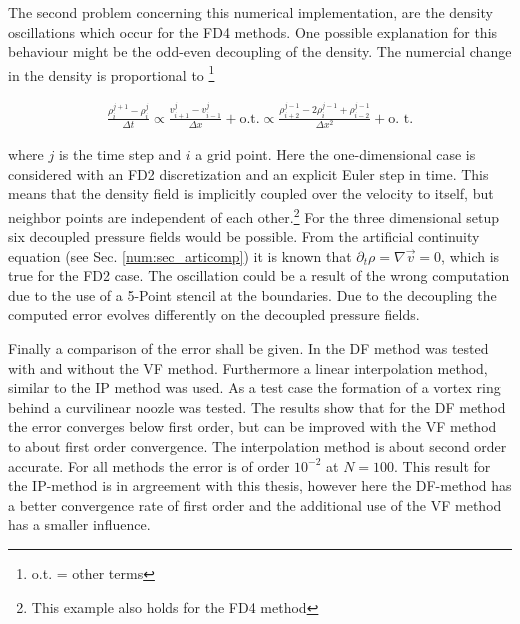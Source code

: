 The second problem concerning this numerical implementation, are the density oscillations
which occur for the FD4 methods.
One possible explanation for this behaviour might be the odd-even decoupling of the density.
The numercial change in the density is  proportional to \footnote{o.t. = other terms}


\begin{align}
    \frac{\rho^{j+1}_{i} -  \rho^{j}_i}{\Delta t}  \propto \frac{ v^j_{i+1} - v^j_{i-1}}{\Delta x} + \text{o.t.}
     \propto \frac{\rho^{j-1}_{i+2} - 2 \rho^{j-1}_{i}  + \rho^{j-1}_{i-2}}{\Delta x^2} + \text{o. t.}
\end{align}

where $j$ is the time step and $i$ a grid point. Here the one-dimensional case is considered with an FD2 discretization and an explicit Euler step in time.
This means that the density field is implicitly coupled over the velocity to itself,
but neighbor points are independent of each other.\footnote{This example also holds for the FD4 method}
For the three dimensional setup six decoupled pressure fields would be possible.
From the artificial continuity equation (see Sec. \ref{num:sec_articomp})
it is known that $\partial_t \rho  = \nabla \vec{v} =  0$, which is true for the FD2 case.
The oscillation could be a result of the  wrong computation due to the use of a 5-Point stencil at the boundaries.
Due to the decoupling the computed error evolves differently on the decoupled pressure fields.

Finally a comparison of the error shall be given.
In \citep{Fadlun2000} the DF method was tested with and without the VF method.
Furthermore a linear interpolation method, similar to the IP method was used.
As a test case the formation of a vortex ring behind a curvilinear noozle was tested.
The results show that for the DF method the error converges below first order, but can be
improved with the VF method to about first order convergence.
The interpolation method is about second order accurate.
For all methods the error is of order $10^{-2}$ at $N=100$.
This result for the IP-method is in argreement with this thesis, however here the DF-method has a better convergence rate of first order and
the additional use of the VF method has a smaller influence.

